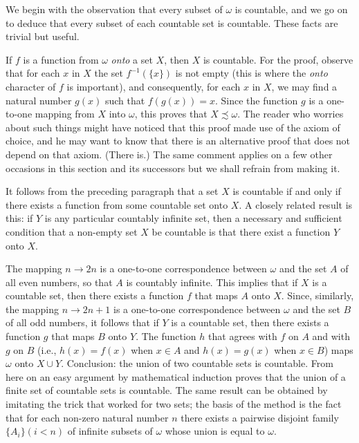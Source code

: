 We begin with the observation that every subset of $\omega$ is countable, and we go on to deduce that every subset of each countable set is countable. These facts are trivial but useful.

If $f$ is a function from $\omega$ \textit{onto} a set $X$, then $X$ is countable. For the proof, observe that for each $x$ in $X$ the set $f^{-1}(\{ x \})$ is not empty (this is where the \textit{onto} character of $f$ is important), and consequently, for each $x$ in $X$, we may find a natural number $g(x)$ such that $f(g(x)) = x$. Since the function $g$ is a one-to-one mapping from $X$ into $\omega$, this proves that $X \precsim \omega$. The reader who worries about such things might have noticed that this proof made use of the axiom of choice, and he may want to know that there is an alternative proof that does not depend on that axiom. (There is.) The same comment applies on a few other occasions in this section and its successors but we shall refrain from making it.

It follows from the preceding paragraph that a set $X$ is countable if and only if there exists a function from some countable set onto $X$. A closely related result is this: if $Y$ is any particular countably infinite set, then a necessary and sufficient condition that a non-empty set $X$ be countable is that there exist a function $Y$ onto $X$.

The mapping $n \rightarrow 2n$ is a one-to-one correspondence between $\omega$ and the set $A$ of all even numbers, so that $A$ is countably infinite. This implies that if $X$ is a countable set, then there exists a function $f$ that maps $A$ onto $X$. Since, similarly, the mapping $n \rightarrow 2n + 1$ is a one-to-one correspondence between $\omega$ and the set $B$ of all odd numbers, it follows that if $Y$ is a countable set, then there exists a function $g$ that maps $B$ onto $Y$. The function $h$ that agrees with $f$ on $A$ and with $g$ on $B$ (i.e., $h(x) = f(x)$ when $x \in A$ and $h(x) = g(x)$ when $x \in B$) maps $\omega$ onto $X \cup Y$. Conclusion: the union of two countable sets is countable. From here on an easy argument by mathematical induction proves that the union of a finite set of countable sets is countable. The same result can be obtained by imitating the trick that worked for two sets; the basis of the method is the fact that for each non-zero natural number $n$ there exists a pairwise disjoint family $\{ A_{i} \} (i < n)$ of infinite subsets of $\omega$ whose union is equal to $\omega$.

